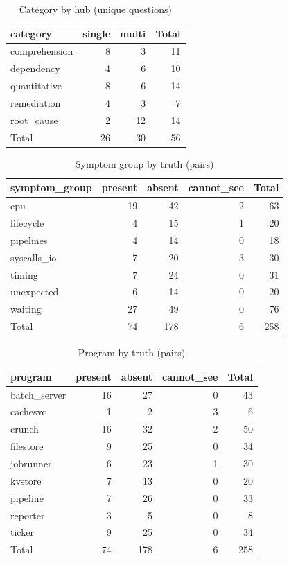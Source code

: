 \begin{table}[htbp]
\centering
\caption{Category by hub (unique questions)}
\label{tab:benchname-composition-1}
\begin{tabular}{lrrr}
\toprule
category & single & multi & Total \\
\midrule
comprehension & 8 & 3 & 11 \\
dependency & 4 & 6 & 10 \\
quantitative & 8 & 6 & 14 \\
remediation & 4 & 3 & 7 \\
root\_cause & 2 & 12 & 14 \\
\midrule
Total & 26 & 30 & 56 \\
\bottomrule
\end{tabular}
\end{table}

\begin{table}[htbp]
\centering
\caption{Symptom group by truth (pairs)}
\label{tab:benchname-composition-2}
\begin{tabular}{lrrrr}
\toprule
symptom\_group & present & absent & cannot\_see & Total \\
\midrule
cpu & 19 & 42 & 2 & 63 \\
lifecycle & 4 & 15 & 1 & 20 \\
pipelines & 4 & 14 & 0 & 18 \\
syscalls\_io & 7 & 20 & 3 & 30 \\
timing & 7 & 24 & 0 & 31 \\
unexpected & 6 & 14 & 0 & 20 \\
waiting & 27 & 49 & 0 & 76 \\
\midrule
Total & 74 & 178 & 6 & 258 \\
\bottomrule
\end{tabular}
\end{table}

\begin{table}[htbp]
\centering
\caption{Program by truth (pairs)}
\label{tab:benchname-composition-3}
\begin{tabular}{lrrrr}
\toprule
program & present & absent & cannot\_see & Total \\
\midrule
batch\_server & 16 & 27 & 0 & 43 \\
cachesvc & 1 & 2 & 3 & 6 \\
crunch & 16 & 32 & 2 & 50 \\
filestore & 9 & 25 & 0 & 34 \\
jobrunner & 6 & 23 & 1 & 30 \\
kvstore & 7 & 13 & 0 & 20 \\
pipeline & 7 & 26 & 0 & 33 \\
reporter & 3 & 5 & 0 & 8 \\
ticker & 9 & 25 & 0 & 34 \\
\midrule
Total & 74 & 178 & 6 & 258 \\
\bottomrule
\end{tabular}
\end{table}

